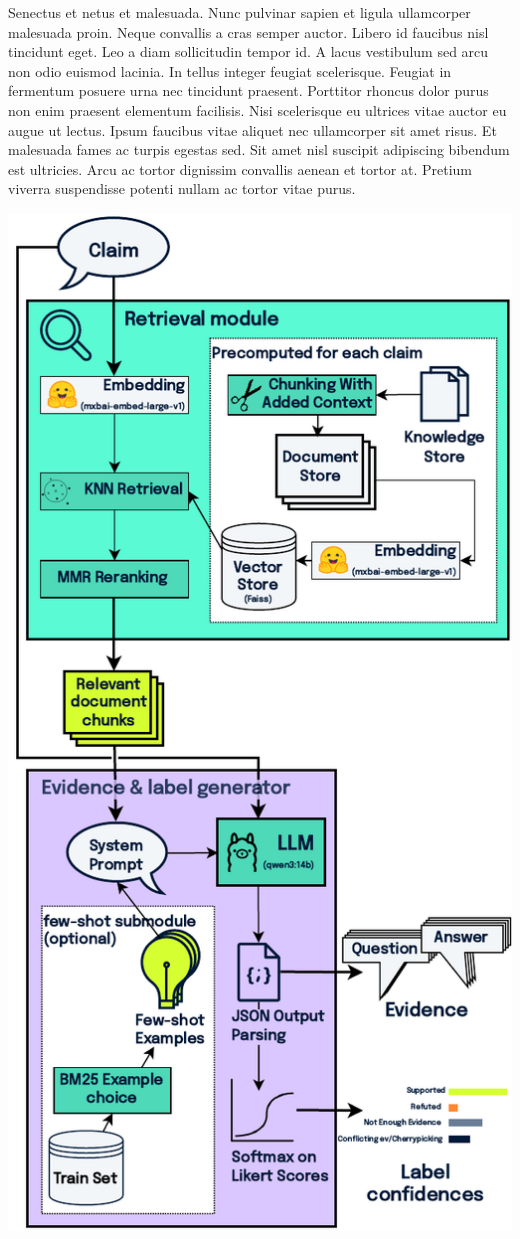 Senectus et netus et malesuada. Nunc pulvinar sapien et ligula ullamcorper malesuada proin. Neque convallis a cras semper auctor. Libero id faucibus nisl tincidunt eget. Leo a diam sollicitudin tempor id. A lacus vestibulum sed arcu non odio euismod lacinia. In tellus integer feugiat scelerisque. Feugiat in fermentum posuere urna nec tincidunt praesent. Porttitor rhoncus dolor purus non enim praesent elementum facilisis. Nisi scelerisque eu ultrices vitae auctor eu augue ut lectus. Ipsum faucibus vitae aliquet nec ullamcorper sit amet risus. Et malesuada fames ac turpis egestas sed. Sit amet nisl suscipit adipiscing bibendum est ultricies. Arcu ac tortor dignissim convallis aenean et tortor at. Pretium viverra suspendisse potenti nullam ac tortor vitae purus. 
\vspace{-1em}
\begin{minipage}{\linewidth}
    \centering
    \includegraphics[width=\linewidth]{figures/pipeline.pdf}

\end{minipage}
